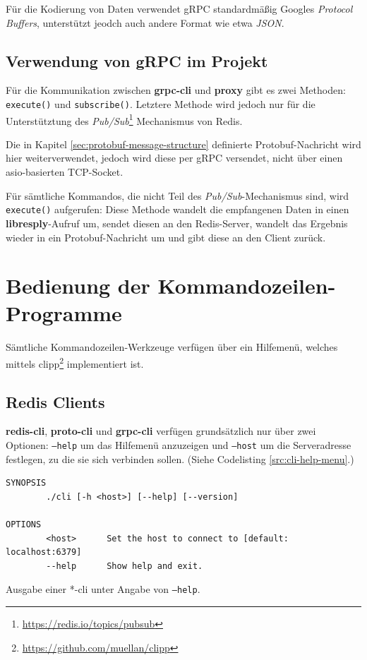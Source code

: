 \documentclass[a4paper,ngerman]{article}
\begin{document}
{Für die Kodierung von Daten verwendet gRPC standardmäßig Googles \textit{Protocol Buffers}, unterstützt jeodch auch andere Format wie etwa \textit{JSON}.

\subsection{Verwendung von gRPC im Projekt}
Für die Kommunikation zwischen \textbf{grpc-cli} und \textbf{proxy} gibt es zwei Methoden: \texttt{execute()} und \texttt{subscribe()}. Letztere Methode wird jedoch nur für die Unterstütztung des \textit{Pub/Sub}\footnote{\url{https://redis.io/topics/pubsub}} Mechanismus von Redis.

Die in Kapitel \ref{sec:protobuf-message-structure} definierte Protobuf-Nachricht wird hier weiterverwendet, jedoch wird diese per gRPC versendet, nicht über einen asio-basierten TCP-Socket.

Für sämtliche Kommandos, die nicht Teil des \textit{Pub/Sub}-Mechanismus sind, wird \texttt{execute()} aufgerufen: Diese Methode wandelt die empfangenen Daten in einen \textbf{libresply}-Aufruf um, sendet diesen an den Redis-Server, wandelt das Ergebnis wieder in ein Protobuf-Nachricht um und gibt diese an den Client zurück.


\section{Bedienung der Kommandozeilen-Programme}
Sämtliche Kommandozeilen-Werkzeuge verfügen über ein Hilfemenü, welches mittels clipp\footnote{\url{https://github.com/muellan/clipp}} implementiert ist.
\subsection{Redis Clients}
\textbf{redis-cli}, \textbf{proto-cli} und \textbf{grpc-cli} verfügen grundsätzlich nur über zwei Optionen: \texttt{--help} um das Hilfemenü anzuzeigen und \texttt{--host} um die Serveradresse festlegen, zu die sie sich verbinden sollen. (Siehe Codelisting \ref{src:cli-help-menu}.)

\begin{listing}[H]
        \begin{verbatim}
SYNOPSIS
        ./cli [-h <host>] [--help] [--version]

OPTIONS
        <host>      Set the host to connect to [default: localhost:6379]
        --help      Show help and exit.
        \end{verbatim}
        \label{src:cli-help-menu}
        \caption{Ausgabe einer *-cli unter Angabe von \texttt{--help}.}
\end{listing}

}
\end{document}
